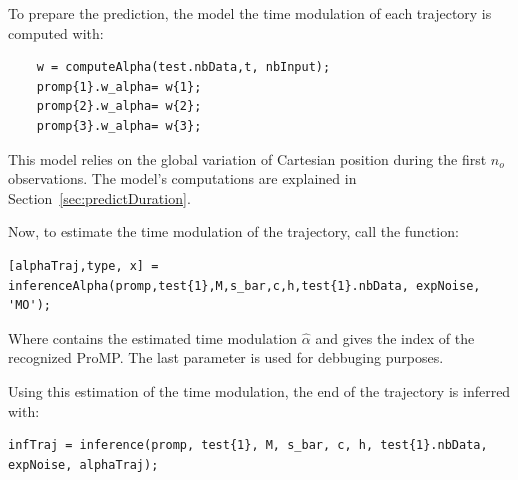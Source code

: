 \documentclass[utf8]{frontiersSCNS} %
\newcommand{\rev}[1]{\textcolor{blue}{#1}}
\begin{document}
To prepare the prediction, the model the time modulation of each trajectory is computed with:
\begin{lstlisting}
    w = computeAlpha(test.nbData,t, nbInput);
    promp{1}.w_alpha= w{1};
    promp{2}.w_alpha= w{2};
    promp{3}.w_alpha= w{3};
\end{lstlisting}
This model relies on the global variation of Cartesian position during the first $n_o$ observations. The model's computations are explained in Section~\ref{sec:predictDuration}.

Now, to estimate the time modulation of the trajectory, call the function:
\begin{lstlisting}
[alphaTraj,type, x] = inferenceAlpha(promp,test{1},M,s_bar,c,h,test{1}.nbData, expNoise, 'MO');
\end{lstlisting}
Where  contains the estimated time modulation $\hat{\alpha}$ and  gives the index of the recognized ProMP. The last parameter  is used for debbuging purposes.


Using this estimation of the time modulation, the end of the trajectory is inferred with:
\begin{lstlisting}
infTraj = inference(promp, test{1}, M, s_bar, c, h, test{1}.nbData, expNoise, alphaTraj);
\end{lstlisting}
%

\end{document}
